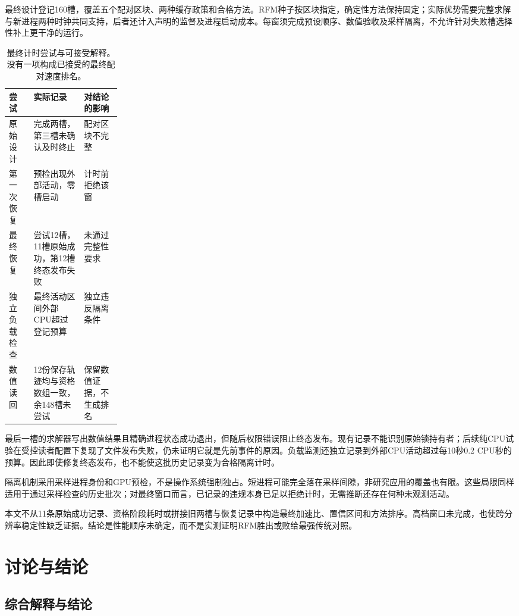 最终设计登记160槽，覆盖五个配对区块、两种缓存政策和合格方法。RFM种子按区块指定，确定性方法保持固定；实际优势需要完整求解与新进程两种时钟共同支持，后者还计入声明的监督及进程启动成本。每窗须完成预设顺序、数值验收及采样隔离，不允许针对失败槽选择性补上更干净的运行。

\begin{table}[tbp]
\centering\small
\caption{最终计时尝试与可接受解释。没有一项构成已接受的最终配对速度排名。}
\label{tab:timing-status}
\begin{tabularx}{\linewidth}{@{}p{0.22\linewidth}XX@{}}
\toprule
尝试 & 实际记录 & 对结论的影响 \\
\midrule
原始设计 & 完成两槽，第三槽未确认及时终止 & 配对区块不完整 \\
第一次恢复 & 预检出现外部活动，零槽启动 & 计时前拒绝该窗 \\
最终恢复 & 尝试12槽，11槽原始成功，第12槽终态发布失败 & 未通过完整性要求 \\
独立负载检查 & 最终活动区间外部CPU超过登记预算 & 独立违反隔离条件 \\
数值读回 & 12份保存轨迹均与资格数组一致，余148槽未尝试 & 保留数值证据，不生成排名 \\
\bottomrule
\end{tabularx}
\end{table}

最后一槽的求解器写出数值结果且精确进程状态成功退出，但随后权限错误阻止终态发布。现有记录不能识别原始锁持有者；后续纯CPU试验在受控读者配置下复现了文件发布失败，仍未证明它就是先前事件的原因。负载监测还独立记录到外部CPU活动超过每10秒0.2 CPU秒的预算。因此即使修复终态发布，也不能使这批历史记录变为合格隔离计时。

隔离机制采用采样进程身份和GPU预检，不是操作系统强制独占。短进程可能完全落在采样间隙，非研究应用的覆盖也有限。这些局限同样适用于通过采样检查的历史批次；对最终窗口而言，已记录的违规本身已足以拒绝计时，无需推断还存在何种未观测活动。

本文不从11条原始成功记录、资格阶段耗时或拼接旧两槽与恢复记录中构造最终加速比、置信区间和方法排序。高档窗口未完成，也使跨分辨率稳定性缺乏证据。结论是性能顺序未确定，而不是实测证明RFM胜出或败给最强传统对照。

\section{讨论与结论}
\label{sec:discussion}



\subsection{综合解释与结论}

